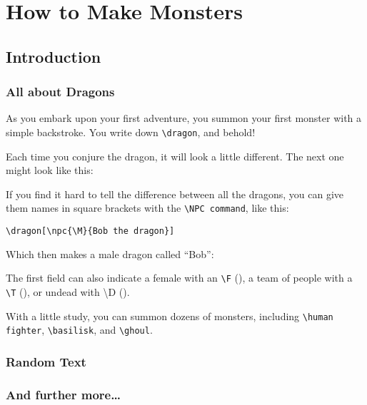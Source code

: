 \documentclass[a4paper,openany]{book}
\date{\today}
\begin{document}
\chapter{How to Make Monsters}

\section{Introduction}

\begin{multicols}{2}

\subsection{All about Dragons}

\begin{boxtext}

As you embark upon your first adventure, you summon your first monster with a simple backstroke.  You write down {\tt {\tt\textbackslash dragon}}, and behold!

\end{boxtext}

\dragon

Each time you conjure the dragon, it will look a little different.
The next one might look like this:

\dragon

If you find it hard to tell the difference between all the dragons, you can give them names in square brackets with the {\tt\textbackslash NPC command}, like this:

{\tt\textbackslash dragon[\textbackslash npc\{\textbackslash M\}\{Bob the dragon\}] }

Which then makes a male dragon called ``Bob'':


The first field can also indicate a female with an {\tt\textbackslash F} (\F), a team of people with a {\tt\textbackslash T} (\T), or undead with \textbackslash D (\D).

With a little study, you can summon dozens of monsters, including {\tt\textbackslash human fighter}, {\tt\textbackslash basilisk}, and {\tt \textbackslash ghoul}.

\subsection{Random Text}

\lipsum[7]

\subsection{And further more\ldots}

\lipsum[10]

\end{multicols}
\end{document}
